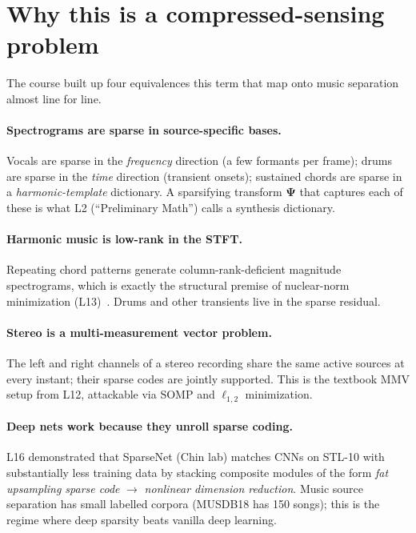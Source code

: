 \documentclass[11pt]{article}
\begin{document}
\section{Why this is a compressed-sensing problem}
The course built up four equivalences this term that map onto music
separation almost line for line.

\paragraph{Spectrograms are sparse in source-specific bases.}
Vocals are sparse in the \emph{frequency} direction (a few formants per
frame); drums are sparse in the \emph{time} direction (transient onsets);
sustained chords are sparse in a \emph{harmonic-template} dictionary.
A sparsifying transform $\bm\Psi$ that captures each of these is what L2
(``Preliminary Math'') calls a synthesis dictionary.

\paragraph{Harmonic music is low-rank in the STFT.}
Repeating chord patterns generate column-rank-deficient magnitude
spectrograms, which is exactly the structural premise of nuclear-norm
minimization (L13)~\cite{candes2009}.  Drums and other transients live in
the sparse residual.

\paragraph{Stereo is a multi-measurement vector problem.}
The left and right channels of a stereo recording share the same active
sources at every instant; their sparse codes are jointly supported.  This
is the textbook MMV setup from L12, attackable via SOMP and
$\ell_{1,2}$ minimization.

\paragraph{Deep nets work because they unroll sparse coding.}
L16 demonstrated that SparseNet (Chin lab) matches CNNs on STL-10 with
substantially less training data by stacking composite modules of the form
\emph{fat upsampling sparse code} $\to$ \emph{nonlinear dimension reduction}.
Music source separation has small labelled corpora (MUSDB18 has 150 songs);
this is the regime where deep sparsity beats vanilla deep learning.
\end{document}

